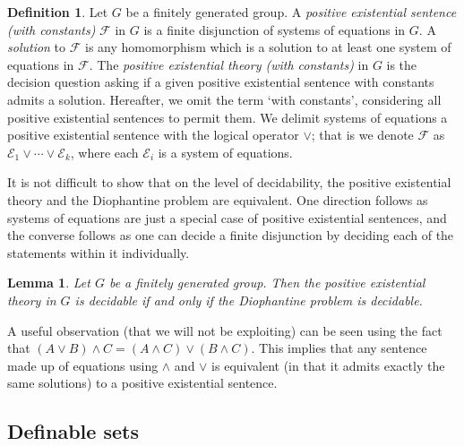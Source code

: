 \documentclass[11pt]{amsart}
\newtheorem{lem}[theorem]{Lemma}
\theoremstyle{definition}
\newtheorem{dfn}[theorem]{Definition}
\numberwithin{theorem}{section}
\begin{document}
	\begin{dfn}
		Let \(G\) be a finitely generated group. A \emph{positive existential
		sentence (with constants)} \(\mathcal F\) in \(G\) is a finite
		disjunction of systems of equations in \(G\). A \emph{solution} to
		\(\mathcal F\) is any homomorphism which is a solution to at least one
		system of equations in \(\mathcal F\). The \emph{positive existential
		theory (with constants)} in \(G\) is the decision question asking if a
		given positive existential sentence with constants admits a solution.
		Hereafter, we omit the term `with constants', considering all positive
		existential sentences to permit them. We delimit systems of equations a
		positive existential sentence with the logical operator \(\vee\); that
		is we denote \(\mathcal F\) as \(\mathcal E_1 \vee \cdots \vee \mathcal
		E_k\), where each \(\mathcal E_i\) is a system of equations.
	\end{dfn}

	It is not difficult to show that on the level of decidability, the
	positive existential theory and the Diophantine problem are equivalent. One
	direction follows as systems of equations are just a special case of
	positive existential sentences, and the converse follows as one can decide
	a finite disjunction by deciding each of the statements within it individually.

	\begin{lem}
		Let \(G\) be a finitely generated group. Then the positive existential
		theory in \(G\) is decidable if and only if the Diophantine problem is
		decidable.
	\end{lem}

	A useful observation (that we will not be exploiting) can be seen using the
	fact that \((A \vee B) \wedge C = (A \wedge C) \vee (B \wedge C)\). This
	implies that any sentence made up of equations using \(\wedge\) and
	\(\vee\) is equivalent (in that it admits exactly the same solutions) to a
	positive existential sentence.

\subsection{Definable sets}
\end{document}
